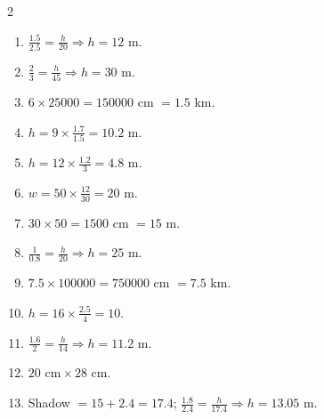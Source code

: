 \documentclass[11pt]{article}
\begin{document}
\begin{keybox}
\begin{multicols}{2}
\small
\begin{enumerate}[leftmargin=*,itemsep=3pt]
  \item $\tfrac{1.5}{2.5}=\tfrac{h}{20}\Rightarrow h=12$ m.
  \item $\tfrac{2}{3}=\tfrac{h}{45}\Rightarrow h=30$ m.
  \item $6\times25000=150000$ cm $=1.5$ km.
  \item $h=9\times\tfrac{1.7}{1.5}=10.2$ m.
  \item $h=12\times\tfrac{1.2}{3}=4.8$ m.
  \item $w=50\times\tfrac{12}{30}=20$ m.
  \item $30\times50=1500$ cm $=15$ m.
  \item $\tfrac{1}{0.8}=\tfrac{h}{20}\Rightarrow h=25$ m.
  \item $7.5\times100000=750000$ cm $=7.5$ km.
  \item $h=16\times\tfrac{2.5}{4}=10$.
  \item $\tfrac{1.6}{2}=\tfrac{h}{14}\Rightarrow h=11.2$ m.
  \item $20\text{ cm}\times28$ cm.
  \item Shadow $=15+2.4=17.4$; $\tfrac{1.8}{2.4}=\tfrac{h}{17.4}\Rightarrow h=13.05$ m.
\end{enumerate}
\end{multicols}
\end{keybox}
\end{document}
